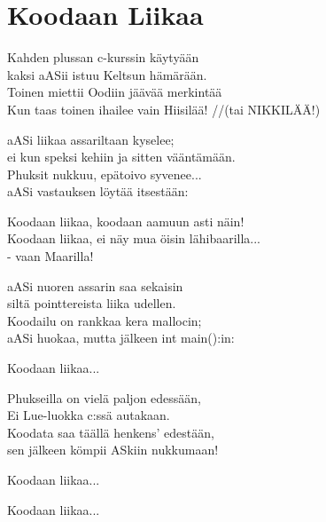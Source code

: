 \section{Koodaan Liikaa}
Kahden plussan c-kurssin käytyään\\
kaksi aASii istuu Keltsun hämärään.\\
Toinen miettii Oodiin jäävää merkintää\\
Kun taas toinen ihailee vain Hiisilää!  //(tai NIKKILÄÄ!)

aASi liikaa assariltaan kyselee;\\
ei kun speksi kehiin ja sitten vääntämään.\\
Phuksit nukkuu, epätoivo syvenee...\\
aASi vastauksen löytää itsestään:

Koodaan liikaa, koodaan aamuun asti näin!\\
Koodaan liikaa, ei näy mua öisin lähibaarilla...\\
- vaan Maarilla!

aASi nuoren assarin saa sekaisin\\
siltä pointtereista liika udellen.\\
Koodailu on rankkaa kera mallocin;\\
aASi huokaa, mutta jälkeen int main():in:

Koodaan liikaa...

Phukseilla on vielä paljon edessään,\\
Ei Lue-luokka c:ssä autakaan.\\
Koodata saa täällä henkens' edestään,\\
sen jälkeen kömpii ASkiin nukkumaan!

Koodaan liikaa...

Koodaan liikaa...
